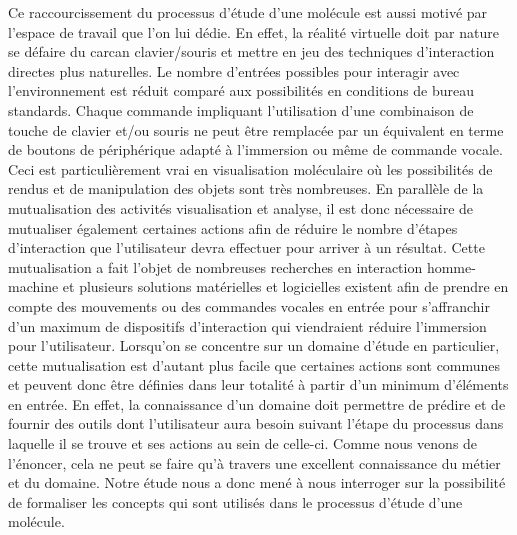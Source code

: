 
Ce raccourcissement du processus d'étude d'une molécule est aussi motivé par l'espace de travail que l'on lui dédie. En effet, la réalité virtuelle doit par nature se défaire du carcan clavier/souris et mettre en jeu des techniques d'interaction directes plus naturelles. Le nombre d'entrées possibles pour interagir avec l'environnement est réduit comparé aux possibilités en conditions de bureau standards. Chaque commande impliquant l'utilisation d'une combinaison de touche de clavier et/ou souris ne peut être remplacée par un équivalent en terme de boutons de périphérique adapté à l'immersion ou même de commande vocale. Ceci est particulièrement vrai en visualisation moléculaire où les possibilités de rendus et de manipulation des objets sont très nombreuses. En parallèle de la mutualisation des activités visualisation et analyse, il est donc nécessaire de mutualiser également certaines actions afin de réduire le nombre d'étapes d'interaction que l'utilisateur devra effectuer pour arriver à un résultat. Cette mutualisation a fait l'objet de nombreuses recherches en interaction homme-machine et plusieurs solutions matérielles et logicielles existent afin de prendre en compte des mouvements ou des commandes vocales en entrée pour s'affranchir d'un maximum de dispositifs d'interaction qui viendraient réduire l'immersion pour l'utilisateur. 
Lorsqu'on se concentre sur un domaine d'étude en particulier, cette mutualisation est d'autant plus facile que certaines actions sont communes et peuvent donc être définies dans leur totalité à partir d'un minimum d'éléments en entrée. En effet, la connaissance d'un domaine doit permettre de prédire et de fournir des outils dont l'utilisateur aura besoin suivant l'étape du processus dans laquelle il se trouve et ses actions au sein de celle-ci. Comme nous venons de l'énoncer, cela ne peut se faire qu'à travers une excellent connaissance du métier et du domaine. Notre étude nous a donc mené à nous interroger sur la possibilité de formaliser les concepts qui sont utilisés dans le processus d'étude d'une molécule.


